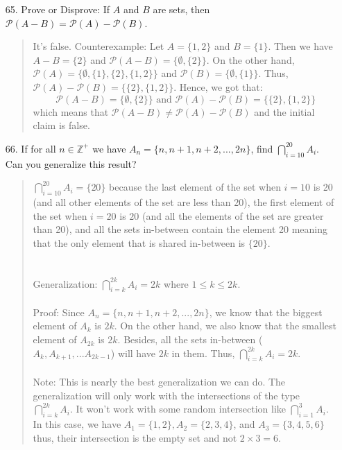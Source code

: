 \documentclass[12pt, a4paper]{article}                      %
\newcommand{\pints}{\mathbb{Z}^+}
\begin{document}
\begin{itemize}
\item[65.]
Prove or Disprove: If $A$ and $B$ are sets, then $\mathcal{P}(A - B) = \mathcal{P}(A) - \mathcal{P}(B)$.
\begin{quote}
It's false. Counterexample: Let $A = \{1, 2\}$ and $B = \{1\}$. Then we have
$A - B = \{2\}$ and $\mathcal{P}(A - B) = \{\emptyset, \{2\}\}$. On the other hand, $\mathcal{P}(A) = \{\emptyset, \{1\}, \{2\}, \{1, 2\}\}$ and $\mathcal{P}(B) = \{\emptyset, \{1\}\}$.
Thus, $\mathcal{P}(A) - \mathcal{P}(B) = \{\{2\}, \{1, 2\}\}$. Hence, we got that:
$$\mathcal{P}(A - B) = \{\emptyset, \{2\}\} \mbox{ and } \mathcal{P}(A) - \mathcal{P}(B) = \{\{2\}, \{1, 2\}\}$$
which means that $\mathcal{P}(A - B) \neq \mathcal{P}(A) - \mathcal{P}(B)$ and the initial claim is false.
\end{quote}

\item[]

\item[66.]
If for all $n \in \pints$ we have $A_n = \{n, n + 1, n + 2, ..., 2n\}$, find $\bigcap_{i = 10}^{20} A_i$. Can you generalize this result?
\begin{quote}
$\bigcap_{i = 10}^{20} A_i = \{20\}$ because the last element of the set when $i = 10$ is 20 (and all other elements of the set are less than 20),
the first element of the set when $i = 20$ is $20$ (and all the elements of the set are greater than 20), and all the sets in-between contain the element
20 meaning that the only element that is shared in-between is $\{20\}$.\\\\\\
Generalization: $\bigcap_{i=k}^{2k}A_i = 2k$ where $1 \leq k \leq 2k$.\\\\
Proof: Since $A_n = \{n, n + 1, n + 2, ..., 2n\}$, we know that the biggest element of $A_k$
is $2k$. On the other hand, we also know that the smallest element of $A_{2k}$
is $2k$. Besides, all the sets in-between ($A_k, A_{k + 1}, ... A_{2k - 1}$) will have $2k$ in them.
Thus, $\bigcap_{i=k}^{2k}A_i = 2k$.\\\\
Note: This is nearly the best generalization we can do. The generalization will only work with the
intersections of the type $\bigcap_{i=k}^{2k}A_i$. It won't work with some random intersection like $\bigcap_{i=1}^{3}A_i$.
In this case, we have $A_1 = \{1, 2\}, A_2 = \{2, 3, 4\}$, and $A_3 = \{3, 4, 5, 6\}$ thus, their intersection is the empty set
and not $2 \times 3 = 6$.
\end{quote}


\end{itemize}
\end{document}
